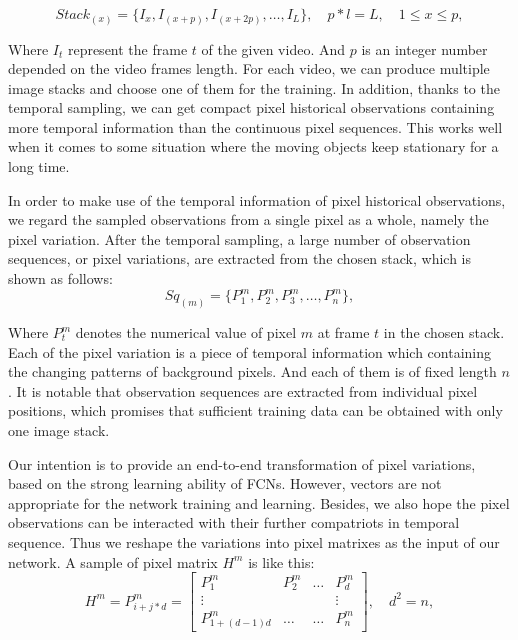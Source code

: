 \documentclass[journal]{IEEEtran}
\begin{document}
\begin{equation}
Stack_{(x)}=\{I_x,I_{(x+p)},I_{(x+2p)},\dots,I_L \},\quad p*l=L,\quad 1\leq   x\leq p , 
\end{equation}

Where $I_t$ represent the frame $t$ of the given video. 
And $p$ is an integer number depended on the video frames length. 
For each video, we can produce multiple image stacks and choose one of them for the training. 
In addition, thanks to the temporal sampling, we can get compact pixel historical observations containing more temporal information than the continuous pixel sequences. 
This works well when it comes to some situation where the moving objects keep stationary for a long time. 

In order to make use of the temporal information of pixel historical observations, we regard the sampled observations from a single pixel as a whole, namely the pixel variation. 
After the temporal sampling, a large number of observation sequences, or pixel variations, are extracted from the chosen stack, which is shown as follows:
\begin{equation}
Sq_{(m)}=\{P_1^m,P_2^m,P_3^m,\dots,P_n^m\},
\end{equation}

Where $P_t^m$ denotes the numerical value of pixel $m$ at frame $t$ in the chosen stack. 
Each of the pixel variation is a piece of temporal information which containing the changing patterns of background pixels. 
And each of them is of fixed length $n$. 
It is notable that observation sequences are extracted from individual pixel positions, which promises that sufficient training data can be obtained with only one image stack.

Our intention is to provide an end-to-end transformation of pixel variations, based on the strong learning ability of FCNs. 
However, vectors are not appropriate for the network training and learning. 
Besides, we also hope the pixel observations can be interacted with their further compatriots in temporal sequence. 
Thus we reshape the variations into pixel matrixes as the input of our network. 
A sample of pixel matrix $H^m$ is like this:
\begin{equation}
H^m=P^m_{i+j*d}=\begin{bmatrix}
 P^m_1& P^m_2  &\dots  &P^m_d \\ 
\vdots &  &  &\vdots \\ 
 P^m_{1+(d-1)d}& \dots & \dots & P^m_n
\end{bmatrix},\quad d^2=n,
\end{equation}
\end{document}
